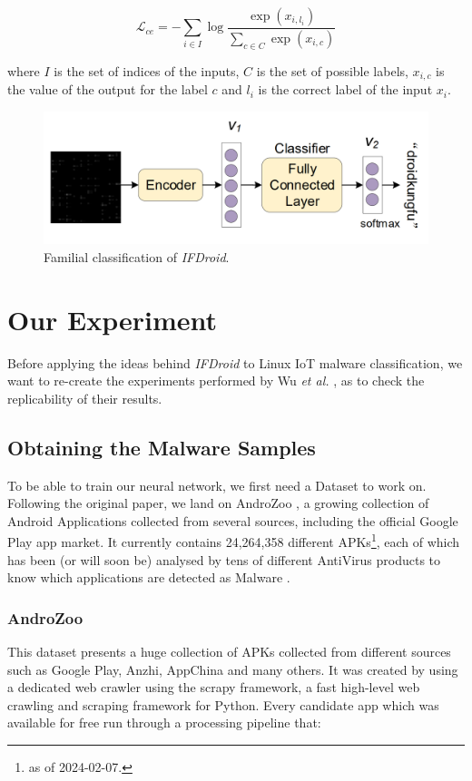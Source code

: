 \begin{equation}
    \mathcal{L}_{c e}=-\sum_{i \in I} \log \frac{\exp \left(x_{i,l_{i}}\right)}{\sum_{c\in C} \exp \left(x_{i,c}\right)}
    \label{eq:CrossEntropy}
\end{equation}

\vspace{1.5pt}
\noindent where $I$ is the set of indices of the inputs, $C$ is the set of possible labels, $x_{i,c}$ is the value of the output for the label $c$ and $l_{i}$ is the correct label of the input $x_{i}$.

\begin{figure}[H]
    \centering
    \includegraphics[width=0.7\linewidth]{Images/Classifier.png}
    \caption{Familial classification of \textit{IFDroid}.}
    \label{fig:Classifier}
\end{figure}

\section{Our Experiment}
Before applying the ideas behind \textit{IFDroid} to Linux IoT malware classification, we want to re-create the experiments performed by Wu \textit{et al.} \cite{wu2022contrastive}, as to check the replicability of their results.

\subsection{Obtaining the Malware Samples}
To be able to train our neural network, we first need a Dataset to work on. Following the original paper, we land on AndroZoo \cite{allix2016androzoo}, a growing collection of Android Applications collected from several sources, including the official Google Play app market. It currently contains 24,264,358 different APKs\footnote{as of 2024-02-07.}, each of which has been (or will soon be) analysed by tens of different AntiVirus products to know which applications are detected as Malware \cite{allix2024androzooweb}.

\subsubsection{AndroZoo}
This dataset presents a huge collection of APKs collected from different sources such as Google Play, Anzhi, AppChina and many others. It was created by using a dedicated web crawler using the scrapy framework, a fast high-level web crawling and scraping framework for Python. Every candidate app which was available for free run through a processing pipeline that:

